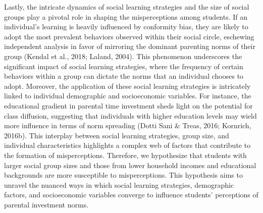 Lastly, the intricate dynamics of social learning strategies and the size of social groups play a pivotal role in shaping the misperceptions among students. If an individual's learning is heavily influenced by conformity bias, they are likely to adopt the most prevalent behaviors observed within their social circle, eschewing independent analysis in favor of mirroring the dominant parenting norms of their group (Kendal et al., 2018; Laland, 2004). This phenomenon underscores the significant impact of social learning strategies, where the frequency of certain behaviors within a group can dictate the norms that an individual chooses to adopt. Moreover, the application of these social learning strategies is intricately linked to individual demographic and socioeconomic variables. For instance, the educational gradient in parental time investment sheds light on the potential for class diffusion, suggesting that individuals with higher education levels may wield more influence in terms of norm spreading (Dotti Sani & Treas, 2016; Kornrich, 2016b). This interplay between social learning strategies, group size, and individual characteristics highlights a complex web of factors that contribute to the formation of misperceptions. Therefore, we hypothesize that students with larger social group sizes and those from lower household incomes and educational backgrounds are more susceptible to misperceptions. This hypothesis aims to unravel the nuanced ways in which social learning strategies, demographic factors, and socioeconomic variables converge to influence students' perceptions of parental investment norms.
